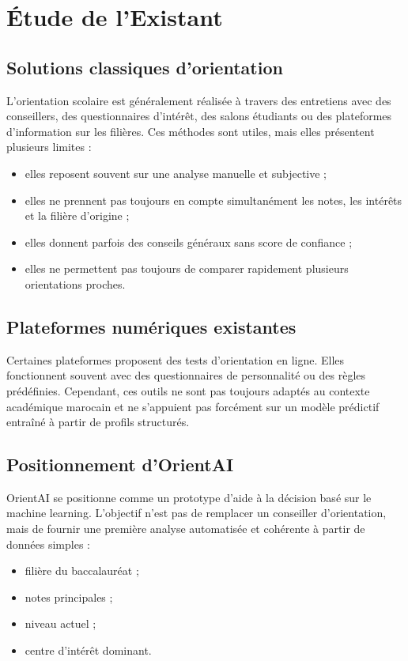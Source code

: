 \documentclass[12pt,a4paper]{report}
\begin{document}
\chapter{Étude de l'Existant}

\section{Solutions classiques d'orientation}
L'orientation scolaire est généralement réalisée à travers des entretiens avec des conseillers, des questionnaires d'intérêt, des salons étudiants ou des plateformes d'information sur les filières. Ces méthodes sont utiles, mais elles présentent plusieurs limites :
\begin{itemize}[label=--]
    \item elles reposent souvent sur une analyse manuelle et subjective ;
    \item elles ne prennent pas toujours en compte simultanément les notes, les intérêts et la filière d'origine ;
    \item elles donnent parfois des conseils généraux sans score de confiance ;
    \item elles ne permettent pas toujours de comparer rapidement plusieurs orientations proches.
\end{itemize}

\section{Plateformes numériques existantes}
Certaines plateformes proposent des tests d'orientation en ligne. Elles fonctionnent souvent avec des questionnaires de personnalité ou des règles prédéfinies. Cependant, ces outils ne sont pas toujours adaptés au contexte académique marocain et ne s'appuient pas forcément sur un modèle prédictif entraîné à partir de profils structurés.

\section{Positionnement d'OrientAI}
OrientAI se positionne comme un prototype d'aide à la décision basé sur le machine learning. L'objectif n'est pas de remplacer un conseiller d'orientation, mais de fournir une première analyse automatisée et cohérente à partir de données simples :
\begin{itemize}[label=--]
    \item filière du baccalauréat ;
    \item notes principales ;
    \item niveau actuel ;
    \item centre d'intérêt dominant.
\end{itemize}
\end{document}
